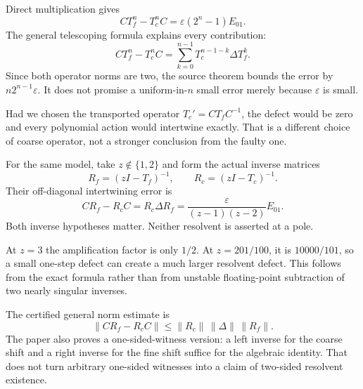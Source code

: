 
Direct multiplication gives
\[
CT_f^n-T_c^nC=\varepsilon(2^n-1)E_{01}.
\]
The general telescoping formula explains every contribution:
\[
CT_f^n-T_c^nC
=\sum_{k=0}^{n-1}T_c^{n-1-k}\Delta T_f^k.
\]
Since both operator norms are two, the source theorem bounds the error by $n2^{n-1}\varepsilon$. It does not promise a uniform-in-$n$ small error merely because $\varepsilon$ is small.

Had we chosen the transported operator $T_c'=CT_fC^{-1}$, the defect would be zero and every polynomial action would intertwine exactly. That is a different choice of coarse operator, not a stronger conclusion from the faulty one.


For the same model, take $z\notin\{1,2\}$ and form the actual inverse matrices
\[
R_f=(zI-T_f)^{-1},\qquad R_c=(zI-T_c)^{-1}.
\]
Their off-diagonal intertwining error is
\[
CR_f-R_cC=R_c\Delta R_f
=\frac{\varepsilon}{(z-1)(z-2)}E_{01}.
\]
Both inverse hypotheses matter. Neither resolvent is asserted at a pole.


At $z=3$ the amplification factor is only $1/2$. At $z=201/100$, it is $10000/101$, so a small one-step defect can create a much larger resolvent defect. This follows from the exact formula rather than from unstable floating-point subtraction of two nearly singular inverses.

The certified general norm estimate is
\[
\|CR_f-R_cC\|
\le \|R_c\|\,\|\Delta\|\,\|R_f\|.
\]
The paper also proves a one-sided-witness version: a left inverse for the coarse shift and a right inverse for the fine shift suffice for the algebraic identity. That does not turn arbitrary one-sided witnesses into a claim of two-sided resolvent existence.

